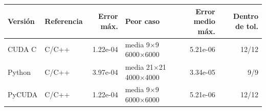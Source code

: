 \begin{tabular}{llrlrr}
\toprule
Versión & Referencia & Error máx. & Peor caso & Error medio máx. & Dentro de tol. \\
\midrule
CUDA C & C/C++ & 1.22e-04 & media 9$\times$9 6000$\times$6000 & 5.21e-06 & 12/12 \\
Python & C/C++ & 3.97e-04 & media 21$\times$21 4000$\times$4000 & 3.34e-05 & 9/9 \\
PyCUDA & C/C++ & 1.22e-04 & media 9$\times$9 6000$\times$6000 & 5.21e-06 & 12/12 \\
\bottomrule
\end{tabular}
